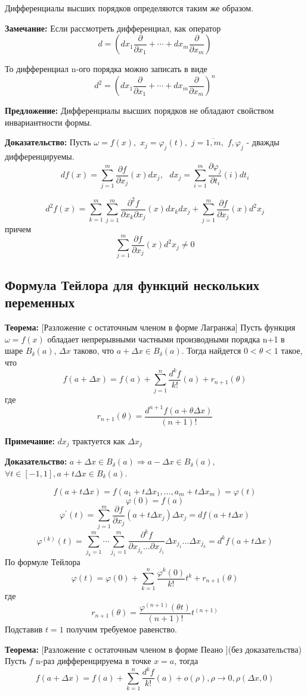 \documentclass[a4paper,12pt]{article} %
\begin{document}
	Дифференциалы высших порядков определяются таким же образом.
	\vspace{5mm}
	
	\textbf{Замечание:} Если рассмотреть дифференциал, как оператор
	\[
		d = \left(dx_1\frac{\partial}{\partial x_1}+\cdots+dx_m\frac{\partial}{\partial x_m}\right)
	\]
	
	То дифференциал n-ого порядка можно записать в виде
	\[
		d^2 = \left(dx_1\frac{\partial}{\partial x_1}+\cdots+dx_m\frac{\partial}{\partial x_m}\right)^n
	\]
	
	\textbf{Предложение:} Дифференциалы высших порядков не обладают свойством инвариантности формы.
	
	\textbf{Доказательство:} Пусть $\omega = f(x), $ $x_j=\varphi_j(t), $  $j=\overline{1, m}, $ $f, \varphi_j$ - дважды дифференцируемы.
	\[
		df(x) = \sum\limits_{j=1}^m\frac{\partial f}{\partial x_j}(x)dx_j, \text{ }dx_j = \sum\limits_{i=1}^m\frac{\partial \varphi_j}{\partial t_i}(i)dt_i
	\]
	
	\[
		d^2f(x) = \sum\limits_{k=1}^m\sum\limits_{j=1}^m
		\frac{\partial^2f}{\partial x_k\partial x_j}(x)dx_kdx_j+\sum\limits_{j=1}^m\frac{\partial f}{\partial x_j}(x)d^2x_j
	\]
	причем
	\[
		\sum\limits_{j=1}^m\frac{\partial f}{\partial x_j}(x)d^2x_j \neq 0
	\]
	
	\subsection*{Формула Тейлора для функций нескольких переменных}
	
	\textbf{Теорема: }[Разложение с остаточным членом в форме Лагранжа] Пусть функция $\omega = f(x)$ обладает непрерывными частными производными порядка n+1 в шаре $B_\delta(a)$, $\Delta x$ таково, что $a+\Delta x\in B_\delta(a)$. Тогда найдется $0<\theta<1$ такое, что 
	\[
		f(a+\Delta x) = f(a) + \sum\limits_{j=1}^n\frac{d^k f}{k!}(a)+r_{n+1}(\theta)
	\]
	где
	\[
		r_{n+1}(\theta) = \frac{d^{n+1}f(a+\theta \Delta x)}{(n+1)!}
	\]
	
	\textbf{Примечание:} $dx_j$ трактуется как $\Delta x_j$
	\vspace{5mm}
	
	\textbf{Доказательство:} $a+\Delta x\in B_\delta(a) \Rightarrow a-\Delta x\in B_\delta(a), $ $\forall t\in[-1, 1], a+t\Delta x\in B_\delta(a)$.
	
	\[
		f(a + t\Delta x) = f(a_1 + t\Delta x_1, \dots, a_m + t\Delta x_m) = \varphi(t)
	\]
	\[
		\varphi(0) = f(a)
	\]
	\[
		\varphi^{'}(t) = \sum\limits_{j=1}^m \frac{\partial f}{\partial x_j}(a+t\Delta x_j)\Delta x_j = df(a+t\Delta x)
	\]
	\[
		\varphi^{(k)}(t) = \sum\limits_{j_k=1}^m\cdots\sum\limits_{j_1=1}^m\frac{\partial^kf}{\partial x_{j_k}\dots\partial x_{j_1}}\Delta x_{j_1}\dots \Delta x_{j_k} = d^kf(a+t\Delta x)
	\]
	По формуле Тейлора
	\[
		\varphi(t) = \varphi(0) +\sum\limits_{k=1}^n\frac{\varphi^k(0)}{k!}t^k + r_{n+1}(\theta)
	\]
	где
	\[
		r_{n+1}(\theta) = \frac{\varphi^{(n+1)}(\theta t)}{(n+1)!}t^{(n+1)}
	\]
	Подставив $t=1$ получим требуемое равенство.
	\vspace{5mm}
	
	\textbf{Теорема: }[Разложение с остаточным членом в форме Пеано ](без доказательства) Пусть $f$ n-раз дифференцируема в точке $x =a$, тогда
	\[
		f(a+\Delta x) = f(a) + \sum\limits_{k=1}^n\frac{d^kf}{k!}(a)+o(\rho), \rho\to 0, \rho(\Delta x, 0)
	\]
	
		
\end{document}
